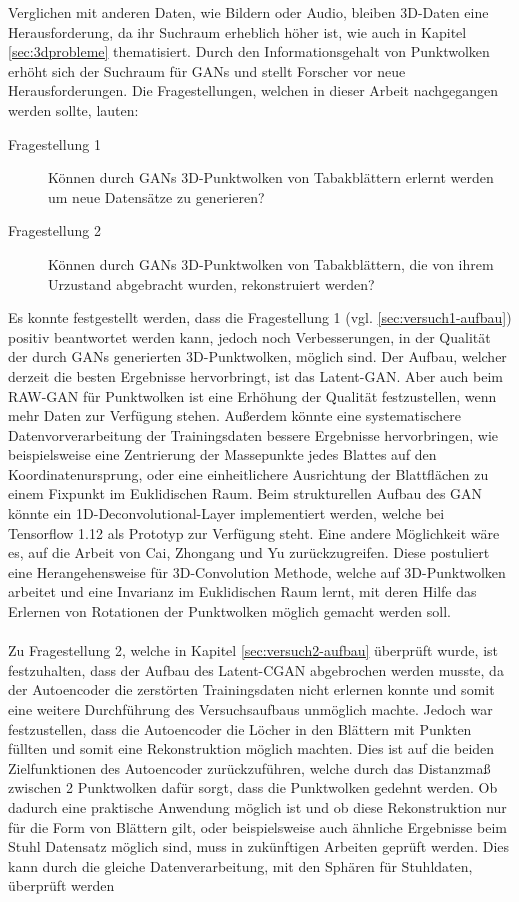 \documentclass{llncs}
\begin{document}
Verglichen mit anderen Daten, wie Bildern oder Audio, bleiben 3D-Daten eine Herausforderung, da ihr Suchraum erheblich höher ist, wie auch in Kapitel \ref{sec:3dprobleme} thematisiert. Durch den Informationsgehalt von Punktwolken erhöht sich der Suchraum für GANs und stellt Forscher vor neue Herausforderungen. Die Fragestellungen, welchen in dieser Arbeit nachgegangen werden sollte, lauten:
\begin{description}
\item[Fragestellung 1] Können durch GANs 3D-Punktwolken von Tabakblättern erlernt werden um neue Datensätze zu generieren?\\
\item[Fragestellung 2] Können durch GANs 3D-Punktwolken von Tabakblättern, die von ihrem Urzustand abgebracht wurden, rekonstruiert werden? 
\end{description}
Es konnte festgestellt werden, dass die Fragestellung 1 (vgl. \ref{sec:versuch1-aufbau}) positiv beantwortet werden kann, jedoch noch Verbesserungen, in der Qualität der durch GANs generierten 3D-Punktwolken, möglich sind. Der Aufbau, welcher derzeit die besten Ergebnisse hervorbringt, ist das Latent-GAN. Aber auch beim RAW-GAN für Punktwolken ist eine Erhöhung der Qualität festzustellen, wenn mehr Daten zur Verfügung stehen. Außerdem könnte eine systematischere Datenvorverarbeitung der Trainingsdaten bessere Ergebnisse hervorbringen, wie beispielsweise eine Zentrierung der Massepunkte jedes Blattes auf den Koordinatenursprung, oder eine einheitlichere Ausrichtung der Blattflächen zu einem Fixpunkt im Euklidischen Raum. Beim strukturellen Aufbau des GAN könnte ein 1D-Deconvolutional-Layer implementiert werden, welche bei Tensorflow 1.12 als Prototyp zur Verfügung steht. Eine andere Möglichkeit wäre es, auf die Arbeit von Cai, Zhongang  und Yu \cite{3d-conv} zurückzugreifen. Diese postuliert eine Herangehensweise für 3D-Convolution Methode, welche auf 3D-Punktwolken arbeitet und eine Invarianz im Euklidischen Raum lernt, mit deren Hilfe das Erlernen von Rotationen der Punktwolken möglich gemacht werden soll.
\\\\
Zu Fragestellung 2, welche in Kapitel \ref{sec:versuch2-aufbau} überprüft wurde, ist festzuhalten, dass der Aufbau des Latent-CGAN abgebrochen werden musste, da der Autoencoder die zerstörten Trainingsdaten nicht erlernen konnte und somit eine weitere Durchführung des Versuchsaufbaus unmöglich machte. Jedoch war festzustellen, dass die Autoencoder die Löcher in den Blättern mit Punkten füllten und somit eine Rekonstruktion möglich machten. Dies ist auf die beiden Zielfunktionen des Autoencoder zurückzuführen, welche durch das Distanzmaß zwischen 2 Punktwolken dafür sorgt, dass die Punktwolken gedehnt werden. Ob dadurch eine praktische Anwendung möglich ist und ob diese Rekonstruktion nur für die Form von Blättern gilt, oder beispielsweise auch ähnliche Ergebnisse beim Stuhl Datensatz möglich sind, muss in zukünftigen Arbeiten geprüft werden. Dies kann durch die gleiche Datenverarbeitung, mit den Sphären für Stuhldaten, überprüft werden 
\end{document}
